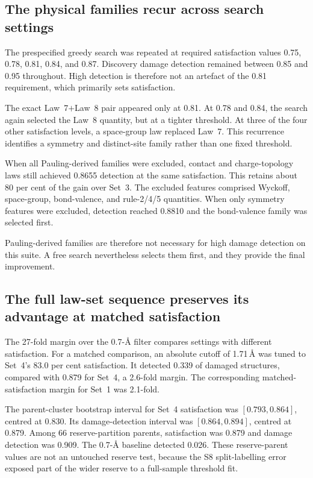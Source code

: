 \subsection{The physical families recur across search settings}

The prespecified greedy search was repeated at required satisfaction values 0.75,
0.78, 0.81, 0.84, and 0.87. Discovery damage detection remained between 0.85
and 0.95 throughout. High detection is therefore not an artefact of the 0.81
requirement, which primarily sets satisfaction.

The exact Law~7$+$Law~8 pair appeared only at 0.81. At 0.78 and 0.84, the search
again selected the Law~8 quantity, but at a tighter threshold. At three of the
four other satisfaction levels, a space-group law replaced Law~7. This
recurrence identifies a symmetry and distinct-site family rather than one fixed
threshold.

When all Pauling-derived families were excluded, contact and charge-topology
laws still achieved 0.8655 detection at the same satisfaction. This retains
about 80 per cent of the gain over Set~3. The excluded features comprised Wyckoff,
space-group, bond-valence, and rule-2/4/5 quantities. When only symmetry features
were excluded, detection reached 0.8810 and the bond-valence family was selected
first.

Pauling-derived families are therefore not necessary for high damage detection
on this suite. A free search nevertheless selects them first, and they provide
the final improvement.

\subsection{The full law-set sequence preserves its advantage at matched satisfaction}

The 27-fold margin over the 0.7-\AA{} filter compares settings with different
satisfaction. For a matched comparison, an absolute cutoff of 1.71\,\AA{} was
tuned to Set~4's 83.0 per cent satisfaction. It detected 0.339 of damaged
structures, compared with 0.879 for Set~4, a 2.6-fold margin. The corresponding
matched-satisfaction margin for Set~1 was 2.1-fold.

The parent-cluster bootstrap interval for Set~4 satisfaction was
$[0.793,0.864]$, centred at 0.830. Its damage-detection interval was
$[0.864,0.894]$, centred at 0.879. Among 66 reserve-partition parents,
satisfaction was 0.879 and damage detection was 0.909. The 0.7-\AA{} baseline
detected 0.026. These reserve-parent values are not an untouched reserve test,
because the S8 split-labelling error exposed part of the wider reserve to a
full-sample threshold fit.

